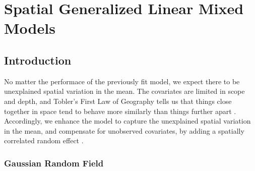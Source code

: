 % 
% 
% 
% 
% 
% 
% 
% 
% 
% 
% 
% 
% 
% 



\section{Spatial Generalized Linear Mixed Models} %

\subsection{Introduction} %

No matter the performace of the previously fit model, we expect there to be unexplained spatial variation in the mean. The covariates are limited in scope and depth, and Tobler's First Law of Geography tells us that things close together in space tend to behave more similarly than things further apart \citep{Tobler1970}. Accordingly, we enhance the model to capture the unexplained spatial variation in the mean, and compensate for unobserved covariates, by adding a spatially correlated random effect  \citep{Banerjee2008}. 

\subsubsection{Gaussian Random Field} %

